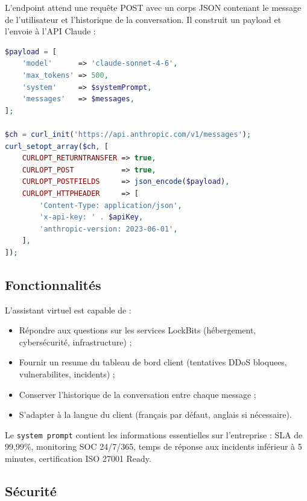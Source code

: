 L'endpoint attend une requête POST avec un corps JSON contenant le
message de l'utilisateur et l'historique de la conversation. Il construit
un payload et l'envoie à l'API Claude :

\begin{lstlisting}[language=PHP, caption={Envoi d'une requête à l'API Claude}, label={lst:chat-payload}]
$payload = [
    'model'      => 'claude-sonnet-4-6',
    'max_tokens' => 500,
    'system'     => $systemPrompt,
    'messages'   => $messages,
];

$ch = curl_init('https://api.anthropic.com/v1/messages');
curl_setopt_array($ch, [
    CURLOPT_RETURNTRANSFER => true,
    CURLOPT_POST           => true,
    CURLOPT_POSTFIELDS     => json_encode($payload),
    CURLOPT_HTTPHEADER     => [
        'Content-Type: application/json',
        'x-api-key: ' . $apiKey,
        'anthropic-version: 2023-06-01',
    ],
]);
\end{lstlisting}

\subsection{Fonctionnalités}

L'assistant virtuel est capable de :

\begin{itemize}
  \item     Répondre aux questions sur les services LockBits (hébergement,
    cybersécurité, infrastructure) ;
  \item Fournir un resume du tableau de bord client (tentatives DDoS
    bloquees, vulnerabilites, incidents) ;
  \item Conserver l'historique de la conversation entre chaque message ;
\item S'adapter à la langue du client (français par défaut, anglais
si nécessaire).
\end{itemize}

Le \texttt{system prompt} contient les informations essentielles sur
l'entreprise : SLA de 99,99\%, monitoring SOC 24/7/365, temps de réponse
aux incidents inférieur à 5 minutes, certification ISO 27001 Ready.

\subsection{Sécurité}


